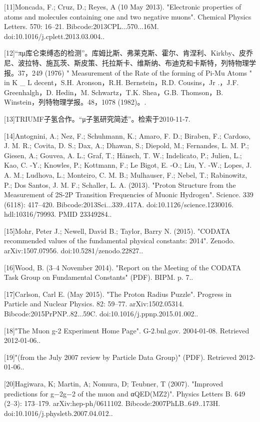 [11]Moncada, F.; Cruz, D.; Reyes, A (10 May 2013). "Electronic properties of atoms and molecules containing one and two negative muons". Chemical Physics Letters. 570: 16–21. Bibcode:2013CPL...570...16M. doi:10.1016/j.cplett.2013.03.004..

[12]“πμ库仑束缚态的检测”。库姆比斯、弗莱克斯、霍尔、肯涅利、Kirkby、皮乔尼、波拉特、施瓦茨、斯皮策、托拉斯卡、维斯纳、布迪克和卡斯特，列特物理学报。37，249 (1976) " Measurement of the Rate of the forming of Pi-Mu Atoms " in K _ L decent，S.H. Aronson，R.H. Bernstein，R.D. Cousins，Jr .，J.F. Greenhalgh，D. Hedin，M. Schwartz，T.K. Shea，G.B. Thomson，B. Winstein，列特物理学报。48，1078 (1982)。.

[13]TRIUMF子氢合作。“μ子氢研究简述”。检索于2010-11-7.

[14]Antognini, A.; Nez, F.; Schuhmann, K.; Amaro, F. D.; Biraben, F.; Cardoso, J. M. R.; Covita, D. S.; Dax, A.; Dhawan, S.; Diepold, M.; Fernandes, L. M. P.; Giesen, A.; Gouvea, A. L.; Graf, T.; Hänsch, T. W.; Indelicato, P.; Julien, L.; Kao, C. -Y.; Knowles, P.; Kottmann, F.; Le Bigot, E. -O.; Liu, Y. -W.; Lopes, J. A. M.; Ludhova, L.; Monteiro, C. M. B.; Mulhauser, F.; Nebel, T.; Rabinowitz, P.; Dos Santos, J. M. F.; Schaller, L. A. (2013). "Proton Structure from the Measurement of 2S-2P Transition Frequencies of Muonic Hydrogen". Science. 339 (6118): 417–420. Bibcode:2013Sci...339..417A. doi:10.1126/science.1230016. hdl:10316/79993. PMID 23349284..

[15]Mohr, Peter J.; Newell, David B.; Taylor, Barry N. (2015). "CODATA recommended values of the fundamental physical constants: 2014". Zenodo. arXiv:1507.07956. doi:10.5281/zenodo.22827..

[16]Wood, B. (3–4 November 2014). "Report on the Meeting of the CODATA Task Group on Fundamental Constants" (PDF). BIPM. p. 7..

[17]Carlson, Carl E. (May 2015). "The Proton Radius Puzzle". Progress in Particle and Nuclear Physics. 82: 59–77. arXiv:1502.05314. Bibcode:2015PrPNP..82...59C. doi:10.1016/j.ppnp.2015.01.002..

[18]"The Muon g-2 Experiment Home Page". G-2.bnl.gov. 2004-01-08. Retrieved 2012-01-06..

[19]"(from the July 2007 review by Particle Data Group)" (PDF). Retrieved 2012-01-06..

[20]Hagiwara, K; Martin, A; Nomura, D; Teubner, T (2007). "Improved predictions for g−2g−2 of the muon and αQED(MZ2)". Physics Letters B. 649 (2–3): 173–179. arXiv:hep-ph/0611102. Bibcode:2007PhLB..649..173H. doi:10.1016/j.physletb.2007.04.012..

